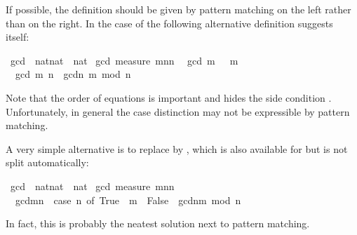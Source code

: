 \begin{isabelle}
\begin{isamarkuptext}
If possible, the definition should be given by pattern matching on the left
rather than  on the right. In the case of  the
following alternative definition suggests itself:%
\end{isamarkuptext}%
\ gcd\ {\isacharcolon}{\isacharcolon}\ {\isachardoublequote}nat{\isacharasterisk}nat\ {\isasymRightarrow}\ nat{\isachardoublequote}\isanewline
{}\ gcd\ {\isachardoublequote}measure\ {\isacharparenleft}{\isasymlambda}{\isacharparenleft}m{\isacharcomma}n{\isacharparenright}{\isachardot}n{\isacharparenright}{\isachardoublequote}\isanewline
\ \ {\isachardoublequote}gcd\ {\isacharparenleft}m{\isacharcomma}\ \ {\isacharequal}\ m{\isachardoublequote}\isanewline
\ \ {\isachardoublequote}gcd\ {\isacharparenleft}m{\isacharcomma}\ n{\isacharparenright}\ {\isacharequal}\ gcdn{\isacharcomma}\ m\ mod\ n{\isacharparenright}{\isachardoublequote}%
\begin{isamarkuptext}%
\noindent
Note that the order of equations is important and hides the side condition
. Unfortunately, in general the case distinction
may not be expressible by pattern matching.

A very simple alternative is to replace  by , which
is also available for  but is not split automatically:%
\end{isamarkuptext}%
\ gcd\ {\isacharcolon}{\isacharcolon}\ {\isachardoublequote}nat{\isacharasterisk}nat\ {\isasymRightarrow}\ nat{\isachardoublequote}\isanewline
{}\ gcd\ {\isachardoublequote}measure\ {\isacharparenleft}{\isasymlambda}{\isacharparenleft}m{\isacharcomma}n{\isacharparenright}{\isachardot}n{\isacharparenright}{\isachardoublequote}\isanewline
\ \ {\isachardoublequote}gcdm{\isacharcomma}n{\isacharparenright}\ {\isacharequal}\ {\isacharparenleft}case\ n{\isacharequal}\ of\ True\ {\isasymRightarrow}\ m\ {\isacharbar}\ False\ {\isasymRightarrow}\ gcdn{\isacharcomma}m\ mod\ n{\isacharparenright}{\isacharparenright}{\isachardoublequote}%
\begin{isamarkuptext}%
\noindent
In fact, this is probably the neatest solution next to pattern matching.


\end{isamarkuptext}
\end{isabelle}
